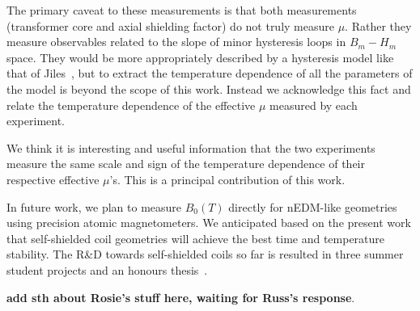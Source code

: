 The primary caveat to these measurements is that both measurements
(transformer core and axial shielding factor) do not truly measure
$\mu$.  Rather they measure observables related to the slope of minor
hysteresis loops in $B_m-H_m$ space.  They would be more appropriately
described by a hysteresis model like that of
Jiles~\cite{jiles1994frequency}, but to extract the temperature
dependence of all the parameters of the model is beyond the scope of
this work.  Instead we acknowledge this fact and relate the
temperature dependence of the effective $\mu$ measured by each
experiment.

We think it is interesting and useful information that the two
experiments measure the same scale and sign of the temperature
dependence of their respective effective $\mu$'s.  This is a principal
contribution of this work.

In future work, we plan to measure $B_0(T)$ directly for nEDM-like
geometries using precision atomic magnetometers.  We anticipated based
on the present work that self-shielded coil geometries will achieve
the best time and temperature stability. The R\&D towards
self-shielded coils so far is resulted in three summer student
projects and an honours thesis~\cite{Rosie_thesis}.

\textbf{add sth about Rosie's stuff here, waiting for Russ's
  response}.















